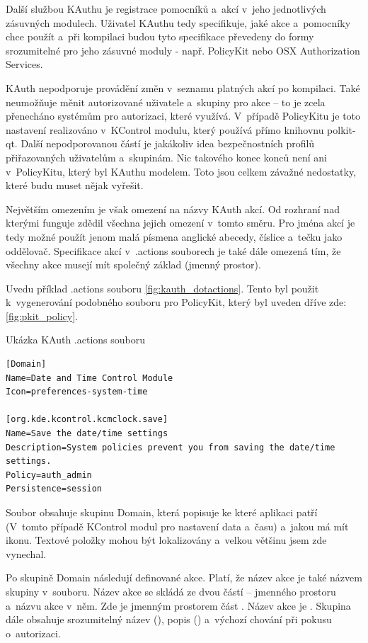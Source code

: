 Další službou KAuthu je registrace pomocníků a~akcí v~jeho jednotlivých zásuvných modulech. Uživatel KAuthu tedy specifikuje, jaké akce a~pomocníky chce použít a~při kompilaci budou tyto specifikace převedeny do formy srozumitelné pro jeho zásuvné moduly - např. PolicyKit nebo OSX Authorization Services.

KAuth nepodporuje provádění změn v~seznamu platných akcí po kompilaci. Také neumožňuje měnit autorizované uživatele a~skupiny pro akce -- to je zcela přenecháno systémům pro autorizaci, které využívá. V~případě PolicyKitu je toto nastavení realizováno v~KControl modulu, který používá přímo knihovnu polkit-qt. Další nepodporovanou částí je jakákoliv idea bezpečnostních profilů přiřazovaných uživatelům a~skupinám. Nic takového konec konců není ani v~PolicyKitu, který byl KAuthu modelem. Toto jsou celkem závažné nedostatky, které budu muset nějak vyřešit.

Největším omezením je však omezení na názvy KAuth akcí. Od rozhraní nad kterými funguje zdědil všechna jejich omezení v~tomto směru. Pro jména akcí je tedy možné použít jenom malá písmena anglické abecedy, číslice a~tečku jako oddělovač. Specifikace akcí v~.actions souborech je také dále omezená tím, že všechny akce musejí mít společný základ (jmenný prostor).

Uvedu příklad .actions souboru \ref{fig:kauth_dotactions}. Tento byl použit k~vygenerování podobného souboru pro PolicyKit, který byl uveden dříve zde: \ref{fig:pkit_policy}.

\begin{mylisting}
\caption{Ukázka KAuth .actions souboru}
\label{fig:kauth_dotactions}
\begin{lstlisting}
[Domain]
Name=Date and Time Control Module
Icon=preferences-system-time

[org.kde.kcontrol.kcmclock.save]
Name=Save the date/time settings
Description=System policies prevent you from saving the date/time settings.
Policy=auth_admin
Persistence=session
\end{lstlisting}
\end{mylisting}

Soubor obsahuje skupinu Domain, která popisuje ke které aplikaci patří (V~tomto případě KControl modul pro nastavení data a~času) a~jakou má mít ikonu. Textové položky mohou být lokalizovány a~velkou většinu jsem zde vynechal.

Po skupině Domain následují definované akce. Platí, že název akce je také názvem skupiny v~souboru. Název akce se skládá ze dvou částí -- jmenného prostoru a~názvu akce v~něm. Zde je jmenným prostorem část . Název akce je . Skupina dále obsahuje srozumitelný název (), popis () a~výchozí chování při pokusu o~autorizaci.

